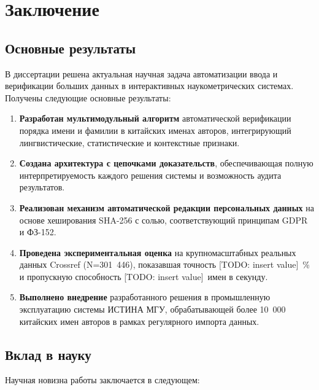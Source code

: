
\chapter{Заключение}
\label{ch:conclusion}

\section{Основные результаты}
\label{sec:concl:results}

В диссертации решена актуальная научная задача автоматизации ввода и верификации больших данных в интерактивных наукометрических системах. Получены следующие основные результаты:

\begin{enumerate}
    \item \textbf{Разработан мультимодульный алгоритм} автоматической верификации порядка имени и фамилии в китайских именах авторов, интегрирующий лингвистические, статистические и контекстные признаки.

    \item \textbf{Создана архитектура с цепочками доказательств}, обеспечивающая полную интерпретируемость каждого решения системы и возможность аудита результатов.

    \item \textbf{Реализован механизм автоматической редакции персональных данных} на основе хеширования SHA-256 с солью, соответствующий принципам GDPR и ФЗ-152.

    \item \textbf{Проведена экспериментальная оценка} на крупномасштабных реальных данных Crossref (N=301~446), показавшая точность [TODO: insert value]~\% и пропускную способность [TODO: insert value]~имен в секунду.

    \item \textbf{Выполнено внедрение} разработанного решения в промышленную эксплуатацию системы ИСТИНА МГУ, обрабатывающей более 10~000 китайских имен авторов в рамках регулярного импорта данных.
\end{enumerate}

\section{Вклад в науку}
\label{sec:concl:contribution}

Научная новизна работы заключается в следующем:

